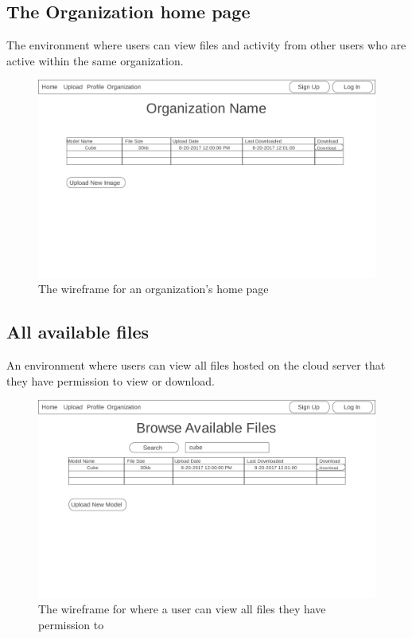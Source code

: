 \subsection{The Organization home page}
    \hspace{7mm}
    The environment where users can view files and activity from other users who are
    active within the same organization.
    \ \\
    \label{fig:proto_web_organization_home}
    \begin{figure}[H]
        \centering \includegraphics[width=0.6\linewidth]{Organization}
        \caption{The wireframe for an organization's home page}
    \end{figure}

\subsection{All available files}
    \hspace{7mm}
    An environment where users can view all files hosted on the cloud server that
    they have permission to view or download.
    \ \\
    \label{fig:proto_web_browse_all_files}
    \begin{figure}[H]
        \centering \includegraphics[width=0.6\linewidth]{All}
        \caption{The wireframe for where a user can view all files they have permission to}
    \end{figure}
